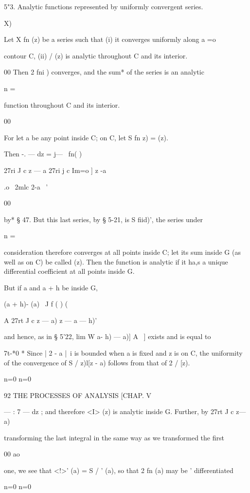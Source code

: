 {{5"3. Analytic functions represented by uniformly convergent series. 

 X) 

Let X fn (z) be a series such that (i) it converges uniformly along a 
 =o 

contour C, (ii) /  (z) is analytic throughout C and its interior. 

00 
Then 2 fni ) converges, and the sum* of the series is an analytic 

n = 

function throughout C and its interior. 

00 

For let a be any point inside C; on C, let S fn z) =  (z). 

Then  -. — dz =  j— \   fn( )\ 

27ri J c z — a 27ri j c Im=o ] z -a 

 .o \ 2mlc 2-a \ ' 

00 

by* § 47. But this last series, by § 5-21, is S fiid)', the series under 

n = 

consideration therefore converges at all points inside C; let its sum inside 
G (as well as on C) be called  (z). Then the function is analytic if it 
ha,s a unique differential coefficient at all points inside G. 

But if a and a + h be inside G, 

 (a + h)- (a) \  J  f   ( ) (  

A 27rt J c  z — a) z — a — h)' 

and hence, as in § 5'22, lim W  a- h) —   a)] A~ ] exists and is equal to 

7t-*0 
* Since | 2 - a |~i is bounded when a is fixed and z is on C, the uniformity of the convergence 
of S /   z)l[z - a) follows from that of 2 /  [z). 

n=0 n=0 



92 THE PROCESSES OF ANALYSIS [CHAP. V 

  — : 7 —    dz ; and therefore <I> (z) is analytic inside G. Further, by 
27rt J c z— a) 

transforming the last integral in the same way as we transformed the first 

00 ao 

one, we see that <!>' (a) = S / ' (a), so that 2 fn (a) may be ' differentiated 

n=0 n=0 

}}

